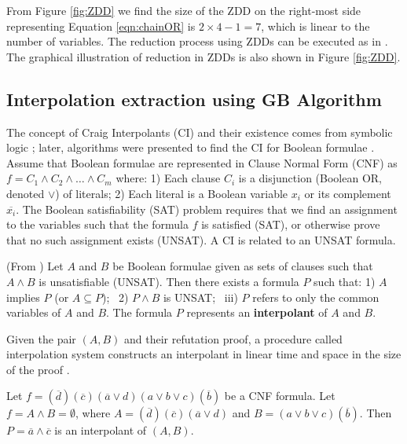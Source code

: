 From Figure \ref{fig:ZDD} we find the size of the ZDD on the right-most side representing 
Equation \ref{eqn:chainOR} is $2\times4 -1 = 7$, which is linear to the number of variables.
The reduction process using ZDDs can be executed as in \cite{polybori:2009}. The graphical illustration 
of reduction in ZDDs is also shown in Figure \ref{fig:ZDD}. 

\subsection{Interpolation extraction using GB Algorithm}
The concept of Craig Interpolants (CI) and their existence comes from
symbolic logic \cite{craig-interpolate}; later, algorithms were
presented to find the CI for Boolean formulae
\cite{pudlak:ci} \cite{mcmillan2003interpolation}. Assume that Boolean
formulae are represented in Clause Normal Form (CNF) as 
$f = C_1 \wedge C_2 \wedge \dots \wedge C_m$ where: 1) Each clause
$C_i$ is a disjunction (Boolean OR, denoted $\vee$) of literals; 2)
Each literal is a Boolean variable $x_i$ or its complement
$\overline{x_i}$. 
The Boolean satisfiability (SAT) problem requires that we find an
assignment to the variables such that the formula $f$ is satisfied
(SAT), or otherwise prove that no such assignment exists (UNSAT). 
A CI is related to an UNSAT formula. 

\begin{Definition}
(From \cite{mcmillan2003interpolation}) Let $A$ and $B$ be Boolean
  formulae given as sets of clauses such that $A \wedge B$ is
  unsatisfiable (UNSAT). Then there exists a formula $P$ such that: 
1) $A$ implies $P$ (or $A \subseteq P$); ~2) $P \wedge B$ is UNSAT; ~iii)
$P$ refers to only the common variables of $A$ and $B$. The formula
$P$ represents an {\bf interpolant} of $A$ and $B$. 

Given  the pair $(A, B)$ and their refutation proof, a procedure
called interpolation system constructs an interpolant in linear time
and space in the size of the proof \cite{mcmillan2003interpolation}
\cite{pudlak:ci}. 
\end{Definition}

\begin{Example}\label{ex1}
Let $f = (\overline{d})(\overline{c})(\overline{a}\vee d)(a
\vee b \vee c)(\overline{b})$ be a CNF formula. Let $f = A \wedge B =
\emptyset$, where $A = (\overline{d})(\overline{c})(\overline{a}\vee
d)$ and  $B = (a \vee b \vee c)(\overline{b})$. Then $P = \overline{a}
\wedge \overline{c}$ is an interpolant of $(A, B)$. 
\end{Example}

